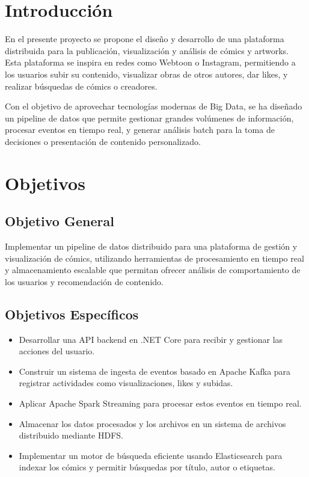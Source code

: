 \section{Introducción}

En el presente proyecto se propone el diseño y desarrollo de una plataforma distribuida para la publicación, visualización y análisis de cómics y artworks. Esta plataforma se inspira en redes como Webtoon o Instagram, permitiendo a los usuarios subir su contenido, visualizar obras de otros autores, dar likes, y realizar búsquedas de cómics o creadores.

Con el objetivo de aprovechar tecnologías modernas de Big Data, se ha diseñado un pipeline de datos que permite gestionar grandes volúmenes de información, procesar eventos en tiempo real, y generar análisis batch para la toma de decisiones o presentación de contenido personalizado.

\section{Objetivos}

\subsection*{Objetivo General}

Implementar un pipeline de datos distribuido para una plataforma de gestión y visualización de cómics, utilizando herramientas de procesamiento en tiempo real y almacenamiento escalable que permitan ofrecer análisis de comportamiento de los usuarios y recomendación de contenido.

\subsection*{Objetivos Específicos}

\begin{itemize}
    \item Desarrollar una API backend en .NET Core para recibir y gestionar las acciones del usuario.
    \item Construir un sistema de ingesta de eventos basado en Apache Kafka para registrar actividades como visualizaciones, likes y subidas.
    \item Aplicar Apache Spark Streaming para procesar estos eventos en tiempo real.
    \item Almacenar los datos procesados y los archivos en un sistema de archivos distribuido mediante HDFS.
    \item Implementar un motor de búsqueda eficiente usando Elasticsearch para indexar los cómics y permitir búsquedas por título, autor o etiquetas.
\end{itemize}

